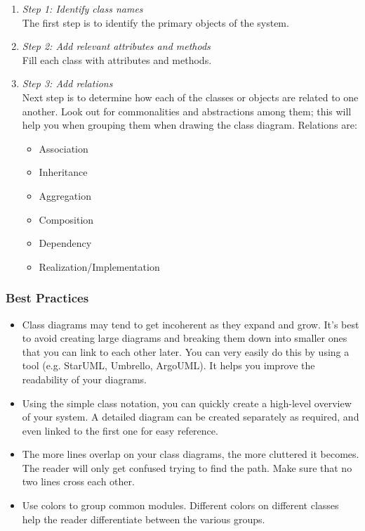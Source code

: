\begin{minipage}[c]{0.45\linewidth}
\begin{enumerate}
\item \emph{Step 1: Identify class names}\\
The first step is to identify the primary objects of the system.

\item \emph{Step 2: Add relevant attributes and methods}\\
Fill each class with attributes and methods.

\item \emph{Step 3: Add relations}\\
Next step is to determine how each of the classes or objects are
related to one another. Look out for commonalities and abstractions
among them; this will help you when grouping them when drawing the
class diagram. Relations are:
\begin{itemize}
\item Association
\item Inheritance
\item Aggregation
\item Composition
\item Dependency
\item Realization/Implementation
\end{itemize}

\end{enumerate}

\subsubsection{Best Practices}

\begin{itemize}
\item Class diagrams may tend to get incoherent as they expand and grow.
It’s best to avoid creating large diagrams and breaking them down into
smaller ones that you can link to each other later. You can very easily do
this by using a tool (e.g. StarUML, Umbrello, ArgoUML). It helps you improve
the readability of your diagrams.
\item Using the simple class notation, you can quickly create a high-level
overview of your system. A detailed diagram can be created separately as
required, and even linked to the first one for easy reference.
\item The more lines overlap on your class diagrams, the more cluttered
it becomes. The reader will only get confused trying to find the path.
Make sure that no two lines cross each other.
\item Use colors to group common modules. Different colors on different
classes help the reader differentiate between the various groups.
\end{itemize}


\end{minipage}
